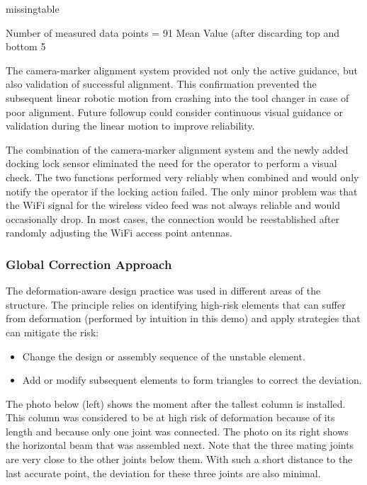 missingtable

Number of measured data points = 91
Mean Value (after discarding top and bottom 5%

The camera-marker alignment system provided not only the active guidance, but also validation of successful alignment. This confirmation prevented the subsequent linear robotic motion from crashing into the tool changer in case of poor alignment. Future followup could consider continuous visual guidance or validation during the linear motion to improve reliability.

The combination of the camera-marker alignment system and the newly added docking lock sensor eliminated the need for the operator to perform a visual check. The two functions performed very reliably when combined and would only notify the operator if the locking action failed. The only minor problem was that the WiFi signal for the wireless video feed was not always reliable and would occasionally drop. In most cases, the connection would be reestablished after randomly adjusting the WiFi access point antennas. 

\subsubsection{Global Correction Approach}
\label{subsubsection:exploration-4-global-correction-approach}

The deformation-aware design practice was used in different areas of the structure. The principle relies on identifying high-risk elements that can suffer from deformation (performed by intuition in this demo) and apply strategies that can mitigate the risk:
\begin{itemize}
    \item Change the design or assembly sequence of the unstable element.
    \item Add or modify subsequent elements to form triangles to correct the deviation.
\end{itemize}

The photo below (left) shows the moment after the tallest column is installed. This column was considered to be at high risk of deformation because of its length and because only one joint was connected. The photo on its right shows the horizontal beam that was assembled next. Note that the three mating joints are very close to the other joints below them. With such a short distance to the last accurate point, the deviation for these three joints are also minimal. 

